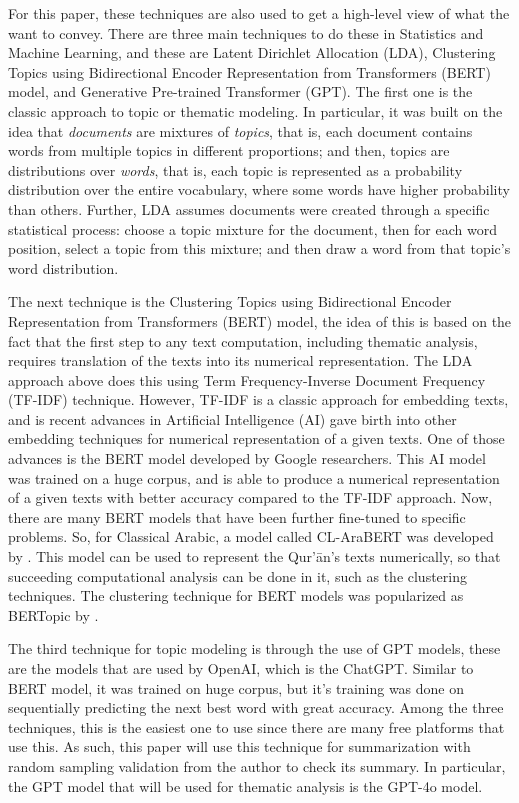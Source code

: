For this paper, these techniques are also used to get a high-level view of what the   want to convey. There are three main techniques to do these in Statistics and Machine Learning, and these are Latent Dirichlet Allocation (LDA), Clustering Topics using Bidirectional Encoder Representation from Transformers (BERT) model, and Generative Pre-trained Transformer (GPT). The first one is the classic approach to topic or thematic modeling. In particular, it was built on the idea that \textit{documents} are mixtures of \textit{topics}, that is, each document contains words from multiple topics in different proportions; and then, topics are distributions over \textit{words}, that is, each topic is represented as a probability distribution over the entire vocabulary, where some words have higher probability than others. Further, LDA assumes documents were created through a specific statistical process: choose a topic mixture for the document, then for each word position, select a topic from this mixture; and then draw a word from that topic's word distribution.

The next technique is the Clustering Topics using Bidirectional Encoder Representation from Transformers (BERT) model, the idea of this is based on the fact that the first step to any text computation, including thematic analysis, requires translation of the texts into its numerical representation. The LDA approach above does this using Term Frequency-Inverse Document Frequency (TF-IDF) technique. However, TF-IDF is a classic approach for embedding texts, and is recent advances in Artificial Intelligence (AI) gave birth into other embedding techniques for numerical representation of a given texts. One of those advances is the BERT model developed by Google researchers. This AI model was trained on a huge corpus, and is able to produce a numerical representation of a given texts with better accuracy compared to the TF-IDF approach. Now, there are many BERT models that have been further fine-tuned to specific problems. So, for Classical Arabic, a model called CL-AraBERT was developed by . This model can be used to represent the Qur'\=an's texts numerically, so that succeeding computational analysis can be done in it, such as the clustering techniques. The clustering technique for BERT models was popularized as BERTopic by .

The third technique for topic modeling is through the use of GPT models, these are the models that are used by OpenAI, which is the ChatGPT. Similar to BERT model, it was trained on huge corpus, but it's training was done on sequentially predicting the next best word with great accuracy. Among the three techniques, this is the easiest one to use since there are many free platforms that use this. As such, this paper will use this technique for summarization with random sampling validation from the author to check its summary. In particular, the GPT model that will be used for thematic analysis is the GPT-4o model. 

